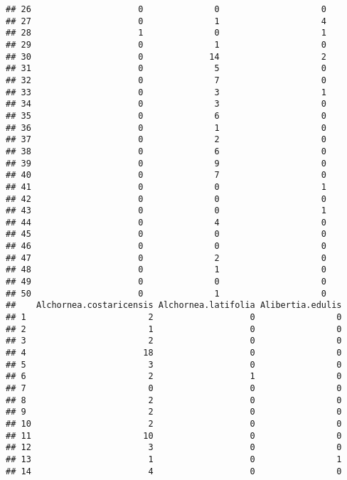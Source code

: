 \documentclass[
]{article}
\begin{document}
\begin{verbatim}
## 26                     0              0                    0
## 27                     0              1                    4
## 28                     1              0                    1
## 29                     0              1                    0
## 30                     0             14                    2
## 31                     0              5                    0
## 32                     0              7                    0
## 33                     0              3                    1
## 34                     0              3                    0
## 35                     0              6                    0
## 36                     0              1                    0
## 37                     0              2                    0
## 38                     0              6                    0
## 39                     0              9                    0
## 40                     0              7                    0
## 41                     0              0                    1
## 42                     0              0                    0
## 43                     0              0                    1
## 44                     0              4                    0
## 45                     0              0                    0
## 46                     0              0                    0
## 47                     0              2                    0
## 48                     0              1                    0
## 49                     0              0                    0
## 50                     0              1                    0
##    Alchornea.costaricensis Alchornea.latifolia Alibertia.edulis
## 1                        2                   0                0
## 2                        1                   0                0
## 3                        2                   0                0
## 4                       18                   0                0
## 5                        3                   0                0
## 6                        2                   1                0
## 7                        0                   0                0
## 8                        2                   0                0
## 9                        2                   0                0
## 10                       2                   0                0
## 11                      10                   0                0
## 12                       3                   0                0
## 13                       1                   0                1
## 14                       4                   0                0

\end{verbatim}
\end{document}
